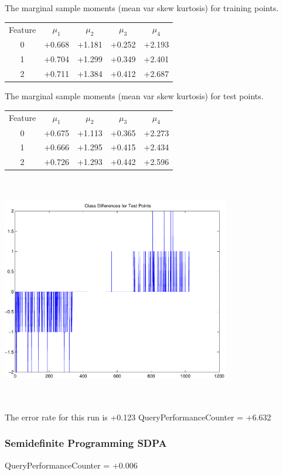 \documentclass[9pt]{article}
\theoremstyle{plain}
\theoremstyle{definition}
\theoremstyle{remark}
\numberwithin{equation}{section}
\begin{document}
The marginal sample moments (mean var skew kurtosis) for training points.\newline
\begin{tabular}{ c |  c  c  c  c}
Feature & $\mu_1$ & $\mu_2$ & $\mu_3$ & $\mu_4$ \\
0 & +0.668 & +1.181 & +0.252& +2.193 \\
\hline
1 & +0.704 & +1.299 & +0.349& +2.401 \\
\hline
2 & +0.711 & +1.384 & +0.412& +2.687 \\
\hline
\end{tabular}
\newline
The marginal sample moments (mean var skew kurtosis) for test points.\newline
\begin{tabular}{ c | c  c  c  c}
Feature & $\mu_1$ & $\mu_2$ & $\mu_3$ & $\mu_4$ \\
0 & +0.675 & +1.113 & +0.365& +2.273\\
\hline
1 & +0.666 & +1.295 & +0.415& +2.434\\
\hline
2 & +0.726 & +1.293 & +0.442& +2.596\\
\hline
\end{tabular}\newline
\includegraphics[width=10.0cm,height=10.0cm]{classDiffs.pdf}

The error rate for this run is +0.123\newline
QueryPerformanceCounter  =  +6.632
\subsubsection{Semidefinite Programming SDPA}
QueryPerformanceCounter  =  +0.006
\end{document}
